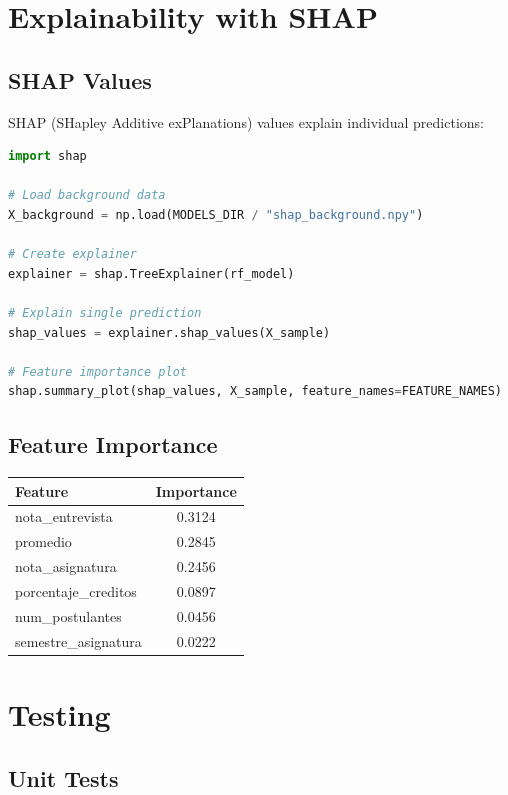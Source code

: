 \documentclass[12pt,a4paper]{report}
\begin{document}
\chapter{Explainability with SHAP}

\section{SHAP Values}

SHAP (SHapley Additive exPlanations) values explain individual predictions:

\begin{lstlisting}[language=Python]
import shap

# Load background data
X_background = np.load(MODELS_DIR / "shap_background.npy")

# Create explainer
explainer = shap.TreeExplainer(rf_model)

# Explain single prediction
shap_values = explainer.shap_values(X_sample)

# Feature importance plot
shap.summary_plot(shap_values, X_sample, feature_names=FEATURE_NAMES)
\end{lstlisting}

\section{Feature Importance}

\begin{center}
\begin{tabular}{|l|c|}
\hline
\textbf{Feature} & \textbf{Importance} \\
\hline
nota\_entrevista & 0.3124 \\
\hline
promedio & 0.2845 \\
\hline
nota\_asignatura & 0.2456 \\
\hline
porcentaje\_creditos & 0.0897 \\
\hline
num\_postulantes & 0.0456 \\
\hline
semestre\_asignatura & 0.0222 \\
\hline
\end{tabular}
\end{center}

\chapter{Testing}

\section{Unit Tests}
\end{document}
